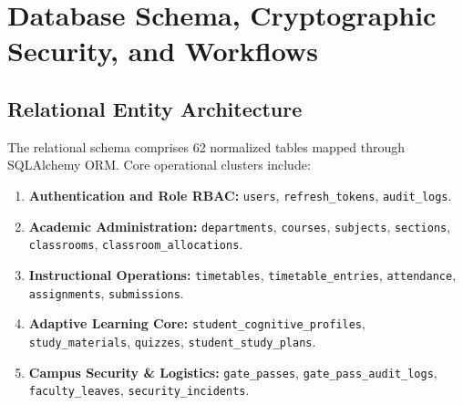 \documentclass[11pt,a4paper]{article}
\begin{document}
\section{Database Schema, Cryptographic Security, and Workflows}
\label{sec:database_sec}

\subsection{Relational Entity Architecture}
The relational schema comprises 62 normalized tables mapped through SQLAlchemy ORM. Core operational clusters include:
\begin{enumerate}[noitemsep]
    \item \textbf{Authentication and Role RBAC:} \texttt{users}, \texttt{refresh\_tokens}, \texttt{audit\_logs}.
    \item \textbf{Academic Administration:} \texttt{departments}, \texttt{courses}, \texttt{subjects}, \texttt{sections}, \texttt{classrooms}, \texttt{classroom\_allocations}.
    \item \textbf{Instructional Operations:} \texttt{timetables}, \texttt{timetable\_entries}, \texttt{attendance}, \texttt{assignments}, \texttt{submissions}.
    \item \textbf{Adaptive Learning Core:} \texttt{student\_cognitive\_profiles}, \texttt{study\_materials}, \texttt{quizzes}, \texttt{student\_study\_plans}.
    \item \textbf{Campus Security \& Logistics:} \texttt{gate\_passes}, \texttt{gate\_pass\_audit\_logs}, \texttt{faculty\_leaves}, \texttt{security\_incidents}.
\end{enumerate}
\end{document}
